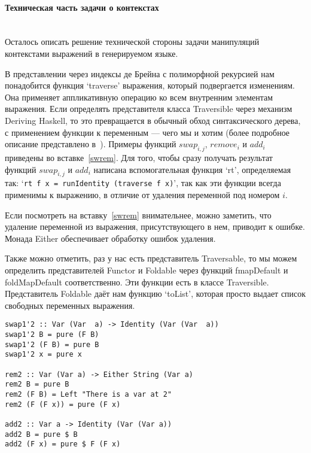 \paragraph{Техническая часть задачи о контекстах} \hspace{0pt} \\

Осталось описать решение технической стороны задачи манипуляций контекстами выражений в генерируемом языке.

В представлении через индексы де Брейна с полиморфной рекурсией нам понадобится функция `traverse' выражения, который подвергается изменениям. Она применяет аппликативную операцию ко всем внутренним элементам выражения. Если определять представителя класса Traversible через механизм Deriving Haskell\cite{deriveFun}, то это превращается в обычный обход синтаксического дерева, с применением функции к переменным --- чего мы и хотим (более подробное описание представлено в~\cite{bound}). Примеры функций $swap_{i,j}$, $remove_i$ и $add_i$ приведены во вставке~\ref{swrem}. Для того, чтобы сразу получать результат функций $swap_{i,j}$ и $add_i$ написана вспомогательная функция `rt', определяемая так: `\lstinline{rt f x = runIdentity (traverse f x)}', так как эти функции всегда применимы к выражению, в отличие от удаления переменной под номером $i$.

Если посмотреть на вставку~\ref{swrem} внимательнее, можно заметить, что удаление переменной из выражения, присутствующего в нем, приводит к ошибке. Монада Either обеспечивает обработку ошибок удаления.

Также можно отметить, раз у нас есть представитель Traversable, то мы можем определить представителей Functor и Foldable через функций fmapDefault и foldMapDefault соответственно. Эти функции есть в классе Traversible. Представитель Foldable даёт нам функцию `toList', которая просто выдает список свободных переменных выражения.

\begin{lstlisting}[label={swrem}, caption={Примеры функций $swap_{i,j}$, $remove_i$ и $add_i$},captionpos=b, frame=single, float, floatplacement=H]
swap1'2 :: Var (Var  a) -> Identity (Var (Var  a))
swap1'2 B = pure (F B)
swap1'2 (F B) = pure B
swap1'2 x = pure x

rem2 :: Var (Var a) -> Either String (Var a)
rem2 B = pure B
rem2 (F B) = Left "There is a var at 2"
rem2 (F (F x)) = pure (F x)

add2 :: Var a -> Identity (Var (Var a))
add2 B = pure $ B
add2 (F x) = pure $ F (F x)
\end{lstlisting}







